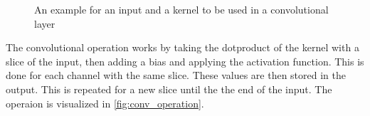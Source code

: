 \begin{figure}
    \centering
    \hfill
    \hfill
    \hfill
    \null
    \caption{An example for an input and a kernel to be used in a convolutional layer}
    \label{fig:conv_input_and_kernel}
\end{figure}


The convolutional operation works by taking the dotproduct of the kernel with a slice of the input, then adding a bias and applying the activation function. This is done for each channel with the same slice. These values are then stored in the output. This is repeated for a new slice until the the end of the input. The operaion is visualized in \autoref{fig:conv_operation}.


